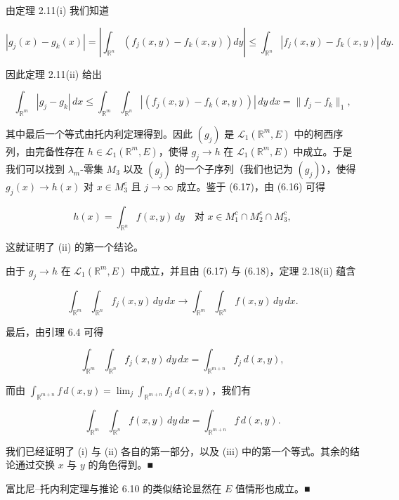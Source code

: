 \begin{theorem}
\begin{items}
由定理 2.11(i) 我们知道

\[
|g_j(x) - g_k(x)| = \left|\int_{\mathbb{R}^n}\left(f_j(x,y) - f_k(x,y)\right)dy\right| \le \int_{\mathbb{R}^n}|f_j(x,y) - f_k(x,y)|\,dy .
\]

因此定理 2.11(ii) 给出

\[
\int_{\mathbb{R}^m}|g_j - g_k|\,dx \le \int_{\mathbb{R}^m}\int_{\mathbb{R}^n}|(f_j(x,y) - f_k(x,y))|\,dy\,dx = \|f_j - f_k\|_1 ,
\]

其中最后一个等式由托内利定理得到。因此 $ (g_j) $ 是 $ \mathcal{L}_1(\mathbb{R}^m,E) $ 中的柯西序列，由完备性存在 $ h \in \mathcal{L}_1(\mathbb{R}^m,E) $，使得 $ g_j \to h $ 在 $ \mathcal{L}_1(\mathbb{R}^m,E) $ 中成立。于是我们可以找到 $ \lambda_m $-零集 $ M_3 $ 以及 $ (g_j) $ 的一个子序列（我们也记为 $ (g_j) $），使得 $ g_j(x) \to h(x) $ 对 $ x \in M_3^c $ 且 $ j \to \infty $ 成立。鉴于 (6.17)，由 (6.16) 可得

\begin{equation}
h(x) = \int_{\mathbb{R}^n} f(x,y)\,dy \quad \text{对 } x \in M_1^c \cap M_2^c \cap M_3^c ,\tag{6.18}
\end{equation}

这就证明了 (ii) 的第一个结论。

\item

由于 $ g_j \to h $ 在 $ \mathcal{L}_1(\mathbb{R}^m,E) $ 中成立，并且由 (6.17) 与 (6.18)，定理 2.18(ii) 蕴含

\[
\int_{\mathbb{R}^m}\int_{\mathbb{R}^n} f_j(x,y)\,dy\,dx \to \int_{\mathbb{R}^m}\int_{\mathbb{R}^n} f(x,y)\,dy\,dx .
\]

最后，由引理 6.4 可得

\[
\int_{\mathbb{R}^m}\int_{\mathbb{R}^n} f_j(x,y)\,dy\,dx = \int_{\mathbb{R}^{m+n}} f_j\,d(x,y) ,
\]

而由 $ \int_{\mathbb{R}^{m+n}} f\,d(x,y) = \lim_j \int_{\mathbb{R}^{m+n}} f_j\,d(x,y) $，我们有

\[
\int_{\mathbb{R}^m}\int_{\mathbb{R}^n} f(x,y)\,dy\,dx = \int_{\mathbb{R}^{m+n}} f\,d(x,y) .
\]

我们已经证明了 (i) 与 (ii) 各自的第一部分，以及 (iii) 中的第一个等式。其余的结论通过交换 $ x $ 与 $ y $ 的角色得到。\nobreak\hspace{0.35em}■

\end{items}

\end{theorem}

\begin{remark}

富比尼–托内利定理与推论 6.10 的类似结论显然在 $ E $ 值情形也成立。\nobreak\hspace{0.35em}■

\end{remark}

